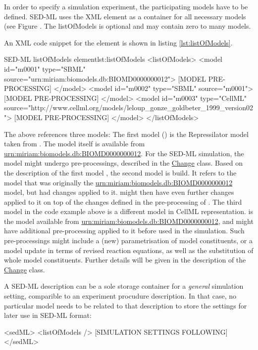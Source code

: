 \label{sec:listOfModels}
In order to specify a simulation experiment, the participating models have to be defined. SED-ML uses the XML  element as a container for all necessary models (see Figure . The listOfModels is optional and may contain zero to many models. 

%

An XML code snippet for the  element is shown in listing \ref{lst:listOfModels}.
%
\begin{myXmlLst}{SED-ML listOfModels element}{lst:listOfModels}
<listOfModels>
 <model id="m0001" type="SBML" source="urn:miriam:biomodels.db:BIOMD0000000012">
 [MODEL PRE-PROCESSING]
 </model>
 <model id="m0002" type="SBML" source="m0001">
 [MODEL PRE-PROCESSING]
 </model>
 <model id="m0003" type="CellML" source="http://www.cellml.org/models/leloup_gonze_goldbeter_1999_version02">
 [MODEL PRE-PROCESSING]
 </model>
</listOfModels>
\end{myXmlLst}
%
The above  references three models: The first model () is the Repressilator model taken from \biom. The model itself is available from \url{urn:miriam:biomodels.db:BIOMD0000000012}. For the SED-ML simulation, the model might undergo pre-processings, described in the \hyperref[class:change]{Change} class.
Based on the description of the first model , the second model is build. It refers to the model that was originally the \url{urn:miriam:biomodels.db:BIOMD0000000012} model, but had changes applied to it.  might then have even further changes applied to it on top of the changes defined in the pre-processing of .
The third model in the code example above is a different model in CellML representation.  is the model available from \url{urn:miriam:biomodels.db:BIOMD0000000012}, and might have additional pre-processing applied to it before used in the simulation.
Such pre-processings might include a (new) parametrisation of model constituents, or a model update in terms of revised reaction equations, as well as the substitution of whole model constituents. Further details will be given in the description of the \hyperref[class:change]{Change} class.

A SED-ML description can be a sole storage container for a \emph{general} simulation setting, comparible to an experiment procudure description. In that case, no particular model needs to be related to that description to store the settings for later use in SED-ML format:
%
\begin{myXmlLst}{}{}
<sedML>
 <listOfModels />
 [SIMULATION SETTINGS FOLLOWING]
</sedML>
\end{myXmlLst}
%




